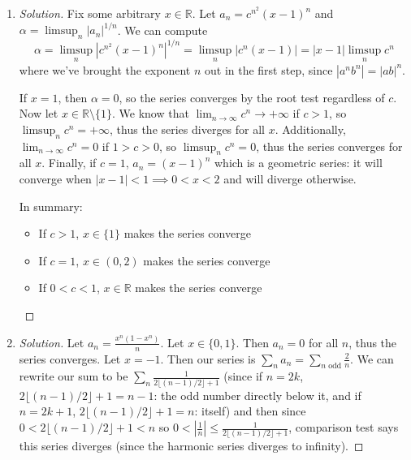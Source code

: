 \documentclass{article}
\newcommand{\R}{{\mathbb R}}
\begin{document}
\begin{enumerate}
	\item \begin{proof}[Solution]\let\qed\relax
		Fix some arbitrary $x \in \R$.
		Let $a_n = c^{n^2}(x-1)^n$
		and $\alpha = \limsup_n|a_n|^{1/n}$.
		We can compute
		\[
			\alpha = \limsup_n \left\lvert c^{n^2}(x-1)^n\right\rvert^{1/n}
			= \limsup_n \left\lvert c^n(x-1)\right\rvert
			= \left\lvert x-1\right\rvert\limsup_n c^n
		\]
		where we've brought the exponent $n$ out in the first step,
		since $|a^nb^n| = |ab|^n$.

		If $x = 1$, then $\alpha = 0$,
		so the series converges by the root test regardless of $c$.
		Now let $x \in \R\setminus\{1\}$.
		We know that $\lim_{n\to\infty} c^n \to +\infty$ if $c > 1$,
		so $\limsup_n c^n = +\infty$, thus the series diverges for all $x$.
		Additionally, $\lim_{n\to\infty}c^n = 0$ if $1 > c > 0$,
		so $\limsup_n c^n = 0$, thus the series converges for all $x$.
		Finally, if $c = 1$, $a_n = (x-1)^n$ which is a geometric series:
		it will converge when $|x-1| < 1 \implies 0 < x < 2$ and will diverge otherwise.

		In summary:
		\begin{itemize}
			\item If $c > 1$, $x \in \{1\}$ makes the series converge
			\item If $c = 1$, $x \in (0,2)$ makes the series converge
			\item If $0 < c < 1$, $x \in \R$ makes the series converge
		\end{itemize}
	\end{proof}
	\item \begin{proof}[Solution]\let\qed\relax
		Let $a_n = \frac{x^n(1-x^n)}{n}$.
		Let $x \in \{0,1\}$.
		Then $a_n = 0$ for all $n$, thus the series converges.
		Let $x = -1$.
		Then our series is $\sum_n a_n = \sum_{n\text{ odd}}\frac{2}{n}$.
		We can rewrite our sum to be $\sum_{n}\frac{1}{2\lfloor (n-1)/2\rfloor+1}$
		(since if $n = 2k$, $2\lfloor (n-1)/2\rfloor+1 =n - 1$: the odd
		number directly below it,
		and if $n = 2k+1$, $2\lfloor (n-1)/2\rfloor+1 = n$: itself)
		and then since $0 <2\lfloor (n-1)/2\rfloor+1<n$
		so $0 < \left\lvert\frac{1}{n}\right\rvert
		\leq \frac{1}{2\lfloor (n-1)/2\rfloor+1}$,
		comparison test says this series diverges
		(since the harmonic series diverges to infinity).
		

\end{proof}
\end{enumerate}
\end{document}
